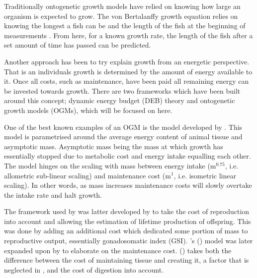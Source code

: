 \documentclass[a4paper, 11pt, hidelinks]{article} %
\begin{document}
	
	Traditionally ontogenetic growth models have relied on knowing how large an organism is expected to grow.
	The von Bertalanffy growth equation relies on knowing the longest a fish can be and the length of the fish at the beginning of measurements \parencite{vonBertalanffy1938, Putter1918}.  From here, for a known growth rate, the length of the fish after a set amount of time has passed can be predicted.
	
	Another approach has been to try explain growth from an energetic perspective.  That is an individuals growth is determined by the amount of energy available to it.  Once all costs, such as maintenance, have been paid all remaining energy can be invested towards growth.  There are two frameworks which have been built around this concept; dynamic energy budget (DEB) theory%
	and ontogenetic growth models (OGMs), which will be focused on here.

	One of the best known examples of an OGM is the model developed by \cite{West2001}.  This model is parametrised around the average energy content of animal tissue and asymptotic mass.  Asymptotic mass being the mass at which growth has essentially stopped due to metabolic cost and energy intake equalling each other. The model hinges on the scaling with mass between energy intake (m$^{0.75}$, i.e. allometric sub-linear scaling) and maintenance cost (m$^1$, i.e. isometric linear scaling).  In other words, as mass increases maintenance costs will slowly overtake the intake rate and halt growth.  	
	
	
	The framework used by \cite{West2001} was latter developed by \cite{Charnov2001} to take the cost of reproduction into account and allowing the estimation of lifetime production of offspring.  This was done by adding an additional cost which dedicated some portion of mass to reproductive output, essentially gonadosomatic index (GSI).	%
	\citeauthor{West1997}'s (\citeyear{West2001}) model was later expanded upon by \cite{Hou2008} to elaborate on the maintenance cost.  \citeauthor{Hou2008} (\citeyear{Hou2008}) takes both the difference between the cost of maintaining tissue and creating it, a factor that is neglected in \cite{West2001}, and the cost of digestion into account.
	
\end{document}
